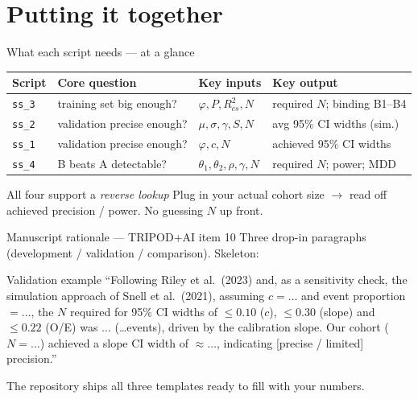 \documentclass[10pt,aspectratio=169]{beamer}
\begin{document}
\section{Putting it together}
\begin{frame}{What each script needs --- at a glance}
  \centering\small
  \begin{tabular}{@{}llll@{}}
    \toprule
    \textbf{Script} & \textbf{Core question} & \textbf{Key inputs} & \textbf{Key output}\\
    \midrule
    \texttt{ss\_3} & training set big enough?    & $\varphi, P, R^2_{cs}, N$          & required $N$; binding B1--B4\\
    \texttt{ss\_2} & validation precise enough?  & $\mu,\sigma,\gamma,S,N$            & avg 95\% CI widths (sim.)\\
    \texttt{ss\_1} & validation precise enough?  & $\varphi, c, N$                    & achieved 95\% CI widths\\
    \texttt{ss\_4} & B beats A detectable?       & $\theta_1,\theta_2,\rho,\gamma,N$  & required $N$; power; MDD\\
    \bottomrule
  \end{tabular}
  \vfill
  \begin{block}{All four support a \emph{reverse lookup}}
    Plug in your actual cohort size $\rightarrow$ read off achieved precision / power. No guessing $N$ up front.
  \end{block}
\end{frame}

\begin{frame}{Manuscript rationale --- TRIPOD+AI item 10}
  Three drop-in paragraphs (development / validation / comparison). Skeleton:
  \vfill
  \begin{block}{Validation example}
    \footnotesize
    ``Following Riley et al.\ (2023) and, as a sensitivity check, the simulation approach of Snell et al.\ (2021),
    assuming $c=\ldots$ and event proportion $=\ldots$, the $N$ required for 95\% CI widths of
    $\le 0.10$ ($c$), $\le 0.30$ (slope) and $\le 0.22$ (O/E) was $\ldots$ (\ldots events), driven by the
    calibration slope. Our cohort ($N=\ldots$) achieved a slope CI width of $\approx\ldots$, indicating
    [precise / limited] precision.''
  \end{block}
  \vfill
  {\scriptsize The repository ships all three templates ready to fill with your numbers.}
\end{frame}
\end{document}
